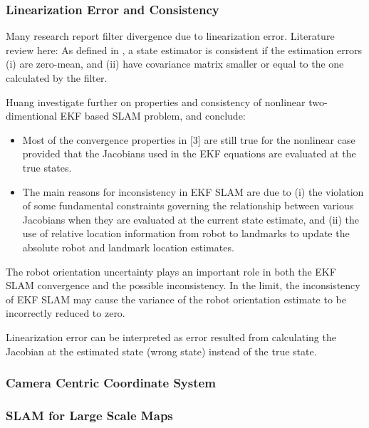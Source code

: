 \subsubsection{Linearization Error and Consistency}
\label{sec:Linearization_error_and_consistency}

Many research report filter divergence due to linearization error. 
Literature review here:
As defined in \cite{Huang_2008}, a state estimator is consistent
if the estimation errors (i) are zero-mean, and (ii) have
covariance matrix smaller or equal to the one calculated by the filter.

Huang investigate further on properties and consistency of nonlinear 
two-dimentional EKF based SLAM problem, and conclude:

\begin{itemize}
  \item Most of the convergence properties in $[$3$]$ are still true for 
  the nonlinear case provided that the Jacobians used in the EKF equations 
  are evaluated at the true states.
  \item The main reasons for inconsistency in EKF SLAM are due to (i) the 
  violation of some fundamental constraints governing the relationship 
  between various Jacobians when they are evaluated at the current state 
  estimate, and (ii) the use of relative location information from robot 
  to landmarks to update the absolute robot and landmark location 
  estimates.
\end{itemize}

The robot orientation uncertainty plays an important role in both the 
EKF SLAM convergence and the possible inconsistency. In the limit, the 
inconsistency of EKF SLAM may cause the variance of the robot 
orientation estimate to be incorrectly reduced to zero.

Linearization error can be interpreted as error resulted from 
calculating the Jacobian at the estimated state (wrong state) instead of 
the true state. 

\subsubsection{Camera Centric Coordinate System}
\label{sec:cam_centric}

\subsubsection{SLAM for Large Scale Maps}


